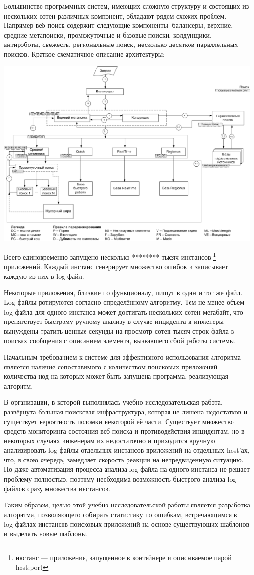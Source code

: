 Большинство программных систем, имеющих сложную структуру и состоящих из
нескольких сотен различных компонент, обладают рядом схожих проблем.
Например веб-поиск содержит следующие компоненты:
балансеры, верхние, средние метапоиски, промежуточные и базовые поиски,
колдунщики, антироботы, свежесть, региональные поиск,
несколько десятков параллельных поисков.
Краткое схематичное описание архитектуры:

\includegraphics[width=\textwidth]{pics/search.png}

Всего единовременно запущено несколько ******** тысяч инстансов
\footnote{инстанс --- приложение, запущенное в контейнере и описываемое парой host:port}
приложений. Каждый инстанс генерирует множество ошибок и записывает каждую
из них в log-файл.

Некоторые приложения, близкие по функционалу, пишут в один и тот же файл.
Log-файлы ротируются согласно определённому алгоритму. Тем не менее объем
log-файла для одного инстанса может достигать нескольких сотен мегабайт,
что препятствует быстрому ручному анализу в случае инцидента и инженеры
вынуждены тратить ценные секунды на просмотр сотен тысяч строк файла в поисках
сообщения с описанием элемента, вызвавшего сбой работы системы.

Начальным требованием к системе для эффективного использования алгоритма
является наличие сопоставимого с количеством поисковых приложений количества
нод на которых может быть запущена программа, реализующая алгоритм.

В организации, в которой выполнялась учебно-исследовательская работа,
развёрнута большая поисковая инфраструктура, которая не лишена недостатков и
существует вероятность поломки некоторой её части. Существует множество
средств мониторинга состояния веб-поиска и противодействия инцидентам,
но в некоторых случаях инженерам их недостаточно и приходится вручную
анализировать log-файлы отдельных инстансов приложений на отдельных host'ах,
что, в свою очередь, замедляет скорость реакции на непредвиденную ситуацию.
Но даже автоматизация процесса анализа log-файла на одного инстанса не решает
проблему полностью, поэтому необходима возможность быстрого анализа log-файлов
сразу множества инстансов.

Таким образом, целью этой учебно-исследовательской работы является разработка
алгоритма, позволяющего собирать статистику по ошибкам, встречающимся
в log-файлах инстансов поисковых приложений на основе существующих
шаблонов и выделять новые шаблоны.
